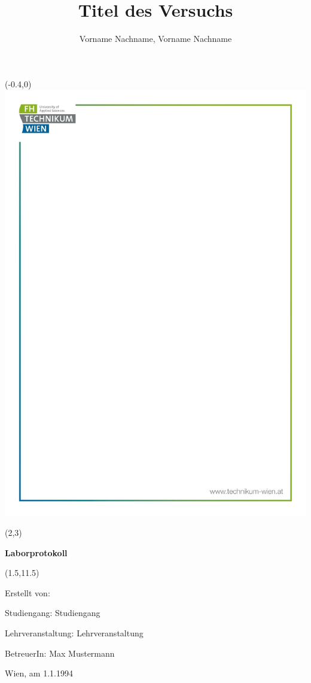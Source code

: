 \documentclass[10pt,a4paper]{article}
\title{Titel des Versuchs}
\author{Vorname Nachname, Vorname Nachname}
\newcommand{\thema}{Laborprotokoll}
\newcommand{\studiengang}{Studiengang}
\newcommand{\lehrveranstaltung}{Lehrveranstaltung}
\newcommand{\betreuerin}{Max Mustermann}
\newcommand{\erstellungsdatum}{1.1.1994}
\begin{document}
\begin{titlepage}

\begin{textblock}{3}(-0.4,0)
\includegraphics{bilder/Deckblatt.pdf}
\end{textblock}
\mbox{}

\begin{textblock}{8}(2,3)

\noindent \Huge \textbf{\thema}

\noindent \Huge  \thetitle
\end{textblock}

\begin{textblock}{12.5}(1.5,11.5)

\Large Erstellt von: \hfill \theauthor

\Large Studiengang: \hfill \studiengang

\Large Lehrveranstaltung: \hfill \lehrveranstaltung

\Large BetreuerIn: \hfill \betreuerin

\Large Wien, am \erstellungsdatum 
\end{textblock}
\end{titlepage}
\end{document}
